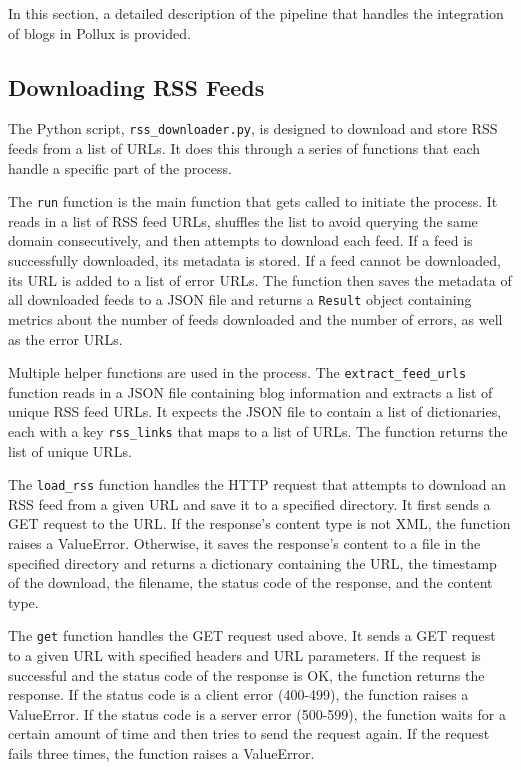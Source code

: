 \documentclass{article}
\begin{document}
In this section, a detailed description of the pipeline that handles the integration of blogs in Pollux is provided.

\subsection{Downloading RSS Feeds}

The Python script, \texttt{rss\_downloader.py}, is designed to download and store RSS feeds from a list of URLs. It does this through a series of functions that each handle a specific part of the process.

The \texttt{run} function is the main function that gets called to initiate the process. It reads in a list of RSS feed URLs, shuffles the list to avoid querying the same domain consecutively, and then attempts to download each feed. If a feed is successfully downloaded, its metadata is stored. If a feed cannot be downloaded, its URL is added to a list of error URLs. The function then saves the metadata of all downloaded feeds to a JSON file and returns a \texttt{Result} object containing metrics about the number of feeds downloaded and the number of errors, as well as the error URLs.

Multiple helper functions are used in the process. The \texttt{extract\_feed\_urls} function reads in a JSON file containing blog information and extracts a list of unique RSS feed URLs. It expects the JSON file to contain a list of dictionaries, each with a key \texttt{rss\_links} that maps to a list of URLs. The function returns the list of unique URLs.

The \texttt{load\_rss} function handles the HTTP request that attempts to download an RSS feed from a given URL and save it to a specified directory. It first sends a GET request to the URL. If the response's content type is not XML, the function raises a ValueError. Otherwise, it saves the response's content to a file in the specified directory and returns a dictionary containing the URL, the timestamp of the download, the filename, the status code of the response, and the content type.

The \texttt{get} function handles the GET request used above. It sends a GET request to a given URL with specified headers and URL parameters. If the request is successful and the status code of the response is OK, the function returns the response. If the status code is a client error (400-499), the function raises a ValueError. If the status code is a server error (500-599), the function waits for a certain amount of time and then tries to send the request again. If the request fails three times, the function raises a ValueError.
\end{document}
